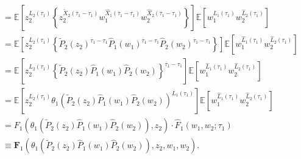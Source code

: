 \documentclass{article}
\newcommand{\esp}{\mathbb{E}}
\begin{document}
\begin{eqnarray*}
\begin{array}{l}
=\esp\left[z_{2}^{L_{2}\left(\tau_{1}\right)}\left\{z_{2}^{\tilde{X}_{2}\left(\overline{\tau}_{1}-\tau_{1}\right)}w_{1}^{\hat{X}_{1}\left(\overline{\tau}_{1}
-\tau_{1}\right)}
w_{2}^{\hat{X}_{2}\left(\overline{\tau}_{1}-\tau_{1}\right)}\right\}\right]\esp\left[w_{1}^{\hat{L}_{1}\left(\tau_{1}\right)}
w_{2}^{\hat{L}_{2}\left(\tau_{1}\right)}\right]\\
=\esp\left[z_{2}^{L_{2}\left(\tau_{1}\right)}\left\{\tilde{P}_{2}\left(z_{2}\right)
^{\overline{\tau}_{1}-\tau_{1}}\hat{P}_{1}\left(w_{1}\right)^{\overline{\tau}_{1}-
\tau_{1}}\hat{P}_{2}\left(w_{2}\right)^{\overline{\tau}_{1}-\tau_{1}}\right\}\right]
\esp\left[w_{1}^{\hat{L}_{1}\left(\tau_{1}\right)}w_{2}^{\hat{L}_{2}\left(\tau_{1}\right)}\right]\\
=\esp\left[z_{2}^{L_{2}\left(\tau_{1}\right)}\left\{\tilde{P}_{2}\left(z_{2}\right)\hat{P}_{1}\left(w_{1}\right)\hat{P}_{2}\left(w_{2}\right)\right\}^{\overline{\tau}_{1}-\tau_{1}}\right]\esp\left[w_{1}^{\hat{L}_{1}\left(\tau_{1}\right)}w_{2}^{\hat{L}_{2}\left(\tau_{1}\right)}\right]\\
=\esp\left[z_{2}^{L_{2}\left(\tau_{1}\right)}\theta_{1}\left(\tilde{P}_{2}\left(z_{2}\right)\hat{P}_{1}\left(w_{1}\right)\hat{P}_{2}\left(w_{2}\right)\right)
^{L_{1}\left(\tau_{1}\right)}\right]\esp\left[w_{1}^{\hat{L}_{1}\left(\tau_{1}\right)}w_{2}^{\hat{L}_{2}\left(\tau_{1}\right)}\right]\\
=F_{1}\left(\theta_{1}\left(\tilde{P}_{2}\left(z_{2}\right)\hat{P}_{1}\left(w_{1}\right)\hat{P}_{2}\left(w_{2}\right)\right),z_{2}\right)\cdot
\hat{F}_{1}\left(w_{1},w_{2};\tau_{1}\right)\\
\equiv \mathbf{F}_{1}\left(\theta_{1}\left(\tilde{P}_{2}\left(z_{2}\right)\hat{P}_{1}\left(w_{1}\right)\hat{P}_{2}\left(w_{2}\right)\right),z_{2},w_{1},w_{2}\right).
\end{array}
\end{eqnarray*}
\end{document}
